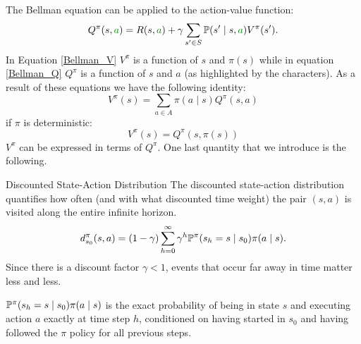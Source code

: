 \documentclass[10pt, a4paper]{report}
\begin{document}
\noindent The Bellman equation can be applied to the action-value function:\begin{equation}\label{Bellman_Q}
    Q^\pi(s,\greenText{a})=R(s,\greenText{a})+\gamma\sum_{s'\in S}\Prob(s' \mid s,\greenText{a})V^\pi(s').
\end{equation}
In Equation \eqref{Bellman_V} $V^\pi$ is a function of $s$ and $\pi(s)$ while in equation \eqref{Bellman_Q} $Q^\pi$ is a function of $s$ and $a$ (as highlighted by the  characters). As a result of these equations we have the following identity:
\begin{equation}
    V^\pi(s)=\sum_{a\in A}\pi(a \mid s)Q^\pi(s,a)
\end{equation}
if $\pi$ is deterministic:
\begin{equation}
    V^\pi(s)=Q^\pi(s,\pi(s))
\end{equation}
$V^\pi$ can be expressed in terms of $Q^\pi$. One last quantity that we introduce is the following.
\begin{boxdefinition}{Discounted State-Action Distribution}{}
    The discounted state-action distribution quantifies how often (and with what discounted time weight) the pair $(s, a)$ is visited along the entire infinite horizon.
    \begin{equation}
        d_{s_0}^\pi(s,a)=(1-\gamma)\sum_{h=0}^\infty \gamma^h{\mathbb P}^\pi(s_h = s \mid s_0)\pi(a \mid s).
    \end{equation}
    Since there is a discount factor $\gamma < 1$, events that occur far away in time matter less and less.
\end{boxdefinition}
${\mathbb P}^\pi(s_h = s \mid s_0)\pi(a \mid s)$ is the exact probability of being in state $s$ and executing action $a$ exactly at time step $h$, conditioned on having started in $s_0$ and having followed the $\pi$ policy for all previous steps.
\end{document}
